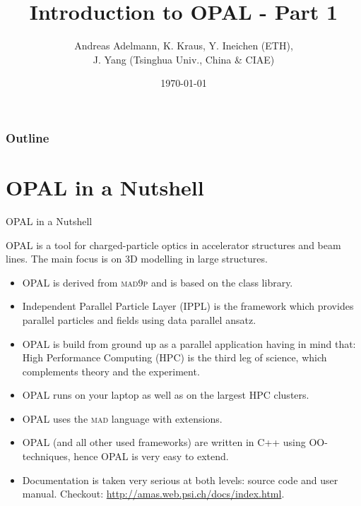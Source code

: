 \documentclass[xcolor=pdftex,table,10pt,yellow,mathserif]{beamer}
\title{Introduction to OPAL - Part 1}
\author{Andreas Adelmann, K. Kraus, Y. Ineichen (ETH), \\J. Yang (Tsinghua Univ., China \& CIAE)}
\date{\today}
\newcommand{\opal}{\textsc{OPAL }}
\newcommand{\mad}{\textsc{mad }}
\newcommand{\madninep}{\textsc{mad9p }}
\begin{document}

\begin{frame}
	  \frametitle{Outline}
	  \tableofcontents
	\end{frame}


\section{OPAL in a Nutshell}

\begin{frame}{OPAL in a Nutshell} 
\begin{alertblock}{}  
 \opal is a tool for charged-particle optics in
accelerator structures and beam lines.  The main focus is on 3D modelling in large structures.
\end{alertblock}
\begin{block}{}  
\begin{itemize}
\item \opal is derived from \madninep and is based 
on the
 class library.

\item Independent Parallel Particle Layer (IPPL) is
the framework which provides parallel particles and fields using data parallel ansatz. 

\item \opal is build from ground up
as a parallel application having in mind that: High Performance Computing (HPC) is the third leg of 
science, which complements theory and the experiment. 
\item  \opal runs on your laptop as well as on the largest HPC clusters. 
\item \opal uses the \mad language with extensions.
\item \opal (and all other used frameworks) are written in C++ using OO-techniques, hence \opal is very easy to extend.
\item Documentation is taken very serious at both levels: source code and user manual. Checkout: \url{ http://amas.web.psi.ch/docs/index.html}.
\end{itemize}
\end{block}
\end{frame}
\end{document}
